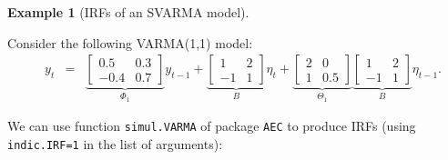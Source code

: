 \documentclass[
  12pt,
]{book}
\theoremstyle{definition}
\theoremstyle{definition}
\newtheorem{example}{Example}[chapter]
\theoremstyle{definition}
\theoremstyle{definition}
\theoremstyle{remark}
\begin{document}
\begin{example}[IRFs of an SVARMA model]
\protect\hypertarget{exm:IRFVARMA}{}\label{exm:IRFVARMA}

Consider the following VARMA(1,1) model:
\begin{eqnarray}
\quad y_t &=&
\underbrace{\left[\begin{array}{cc}
0.5 & 0.3 \\
-0.4 & 0.7
\end{array}\right]}_{\Phi_1}
y_{t-1} +  
\underbrace{\left[\begin{array}{cc}
1 & 2 \\
-1 & 1
\end{array}\right]}_{B}\eta_t + \underbrace{\left[\begin{array}{cc}
2 & 0 \\
1 & 0.5
\end{array}\right]}_{\Theta_1} \underbrace{\left[\begin{array}{cc}
1 & 2 \\
-1 & 1
\end{array}\right]}_{B}\eta_{t-1}.\label{eq:VARMA111}
\end{eqnarray}

We can use function \texttt{simul.VARMA} of package \texttt{AEC} to produce IRFs (using \texttt{indic.IRF=1} in the list of arguments):


\end{example}
\end{document}
